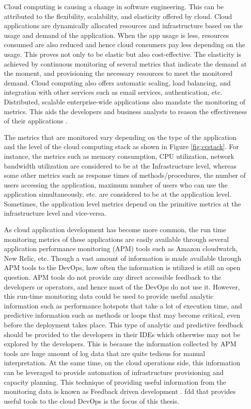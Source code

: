 \documentclass[article,type=msc,colorback,12pt,accentcolor=tud8b,table]{tudthesis}
\begin{document}
	Cloud computing is causing a change in software engineering. This can be attributed to the flexibility, scalability, and elasticity offered by cloud. Cloud applications are dynamically allocated resources and infrastructure based on the usage and demand of the application. When the app usage is less, resources consumed are also reduced and hence cloud consumers pay less depending on the usage. This proves not only to be elastic but also cost-effective. The elasticity is achieved by continuous monitoring of several metrics that indicate the demand at the moment, and provisioning the necessary resources to meet the monitored demand. Cloud computing also offers automatic scaling, load balancing, and integration with other services such as email services, authentication, etc. Distributed, scalable enterprise-wide applications also mandate the monitoring of metrics. This aids the developers and business analysts to reason the effectiveness of their applications \cite{leitner2012application}.
	
	\par The metrics that are monitored vary depending on the type of the application and the level of the cloud computing stack as shown in Figure \ref{fig:ccstack}. For instance, the metrics such as memory consumption, CPU utilization, network bandwidth utilization are considered to be at the Infrastructure level, whereas some other metrics such as response times of methods/procedures, the number of users accessing the application, maximum number of users who can use the application simultaneously, etc. are considered to be at the application level. Sometimes, the application level metrics depend on the primitive metrics at the infrastructure level and vice-versa.
	
	\par As cloud application development has become more common, the run time monitoring metrics of these applications are easily available through several application performance monitoring (APM) tools such as Amazon cloudwatch, New Relic, etc. Though a vast amount of information is made available through APM tools to the DevOps, how often the information is utilized is still an open question. APM tools do not provide any direct accessible feedback to the developers or operators, and hence most of the DevOps do not use it. However, this run-time monitoring data could be used to provide useful analytic information such as performance hotspots that take a lot of execution time, and predictive information such as methods or loops that may become critical, even before the deployment takes place. This type of analytic and predictive feedback should be provided to the developers in their IDEs which otherwise may not be explored by the developers. This is because the information collected by APM tools are huge amount of log data that are quite tedious for manual interpretation. At the same time, on the cloud operations side, this information can be leveraged to provide automation of infrastructure provisioning and capacity planning. This technique of providing useful information from the monitoring data is known as Feedback driven development \cite{cito2015runtime}. \gls{fdd} that provides useful tools to the cloud DevOps is the focus of this thesis.	
	
\end{document}
